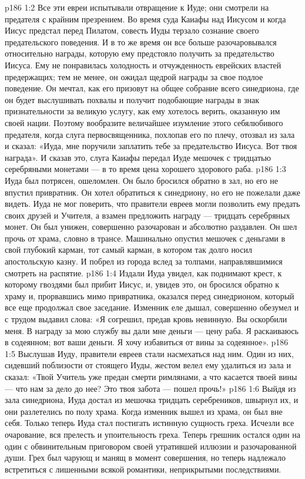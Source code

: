 \vs p186 1:2 Все эти евреи испытывали отвращение к Иуде; они смотрели на предателя с крайним презрением. Во время суда Каиафы над Иисусом и когда Иисус предстал перед Пилатом, совесть Иуды терзало сознание своего предательского поведения. И в то же время он все больше разочаровывался относительно награды, которую ему предстояло получить за предательство Иисуса. Ему не понравилась холодность и отчужденность еврейских властей предержащих; тем не менее, он ожидал щедрой награды за свое подлое поведение. Он мечтал, как его призовут на общее собрание всего синедриона, где он будет выслушивать похвалы и получит подобающие награды в знак признательности за великую услугу, как ему хотелось верить, оказанную им своей нации. Поэтому вообразите величайшее изумление этого себялюбивого предателя, когда слуга первосвященника, похлопав его по плечу, отозвал из зала и сказал: «Иуда, мне поручили заплатить тебе за предательство Иисуса. Вот твоя награда». И сказав это, слуга Каиафы передал Иуде мешочек с тридцатью серебряными монетами --- в то время цена хорошего здорового раба.
\vs p186 1:3 Иуда был потрясен, ошеломлен. Он было бросился обратно в зал, но его не впустил привратник. Он хотел обратиться к синедриону, но его не пожелали даже видеть. Иуда не мог поверить, что правители евреев могли позволить ему предать своих друзей и Учителя, а взамен предложить награду --- тридцать серебряных монет. Он был унижен, совершенно разочарован и абсолютно раздавлен. Он шел прочь от храма, словно в трансе. Машинально опустил мешочек с деньгами в свой глубокий карман, тот самый карман, в котором так долго носил апостольскую казну. И побрел из города вслед за толпами, направлявшимися смотреть на распятие.
\vs p186 1:4 Издали Иуда увидел, как поднимают крест, к которому гвоздями был прибит Иисус, и, увидев это, он бросился обратно к храму и, прорвавшись мимо привратника, оказался перед синедрионом, который все еще продолжал свое заседание. Изменник еле дышал, совершенно обезумел и с трудом выдавил слова: «Я согрешил, предав кровь невинную. Вы оскорбили меня. В награду за мою службу вы дали мне деньги --- цену раба. Я раскаиваюсь в содеянном; вот ваши деньги. Я хочу избавиться от вины за содеянное».
\vs p186 1:5 Выслушав Иуду, правители евреев стали насмехаться над ним. Один из них, сидевший поблизости от стоящего Иуды, жестом велел ему удалиться из зала и сказал: «Твой Учитель уже предан смерти римлянами, а что касается твоей вины --- что нам за дело до нее? Это твоя забота --- пошел прочь!»
\vs p186 1:6 Выйдя из зала синедриона, Иуда достал из мешочка тридцать серебреников, швырнул их, и они разлетелись по полу храма. Когда изменник вышел из храма, он был вне себя. Только теперь Иуда стал постигать истинную сущность греха. Исчезли все очарование, вся прелесть и упоительность греха. Теперь грешник остался один на один с обвинительным приговором своей утратившей иллюзии и разочарованной души. Грех был чарующ и манящ в момент совершения, но теперь надлежало встретиться с лишенными всякой романтики, неприкрытыми последствиями.
